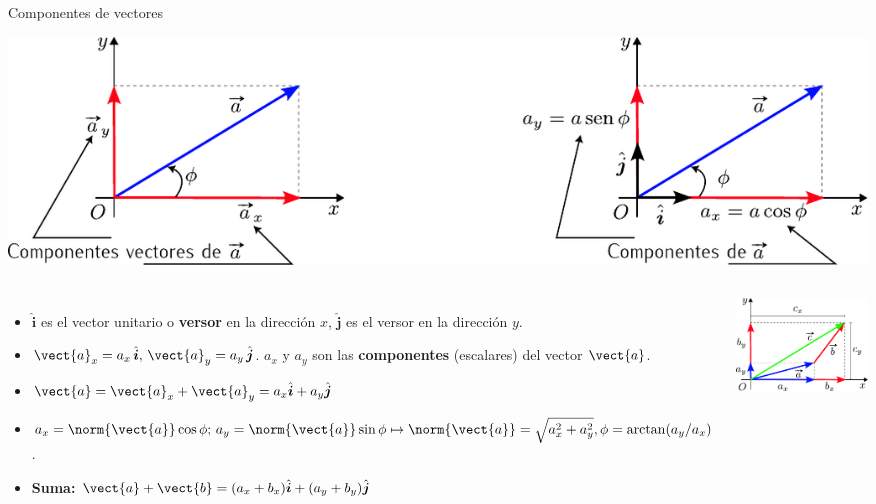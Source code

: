 \documentclass[9pt, aspectratio=169]{beamer}
\begin{document}
\begin{frame}{Componentes de vectores}
\begin{center}
    \includegraphics[scale=0.7]{figs/fig-03}
\end{center}
\begin{columns}
\begin{itemize}
    \item $\hat{\bm{i}}$ es el vector unitario o \textbf{versor} en la dirección $x$, $\hat{\bm{j}}$ es el versor en la dirección $y$.
    \item $\vect{a}_x = a_x \, \hat{\bm{i}}, \, \vect{a}_y = a_y \, \hat{\bm{j}}$. $a_x$ y $a_y$ son las \textbf{componentes} (escalares) del vector $\vect{a}$.
    \item $\vect{a} = \vect{a}_x + \vect{a}_y = a_x \hat{\bm{i}} + a_y \hat{\bm{j}}$
    \item $a_x = \norm{\vect{a}} \cos \phi; \, a_y = \norm{\vect{a}} \sin \phi \mapsto \norm{\vect{a}} = \sqrt{a_x^2 + a_y^2}, \phi = \arctan(a_y / a_x)$.
    \item \textbf{Suma:} $\vect{a} + \vect{b} = (a_x + b_x) \hat{\bm{i}} + (a_y + b_y) \hat{\bm{j}}$
\end{itemize}
\begin{center}
    \includegraphics[width=1.0\textwidth]{figs/fig-04.pdf}
\end{center}
\end{columns}
\end{frame}
\end{document}
